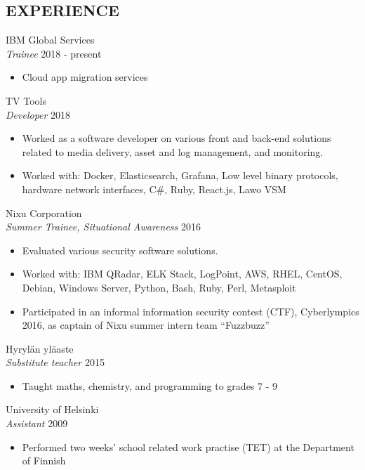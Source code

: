\documentclass[margin, 10pt]{res} %
\begin{document}
\begin{resume}

%
%

 
\section{EXPERIENCE}
  
IBM Global Services\\
{\sl Trainee} \hfill 2018 - present
\begin{itemize} \itemsep -2pt %
\item Cloud app migration services
\end{itemize}

\addvspace{-7pt}
TV Tools\\
{\sl Developer} \hfill 2018
\begin{itemize} \itemsep -2pt %
\item Worked as a software developer on various front and back-end solutions related to media delivery, asset and log management, and monitoring.
\item Worked with: Docker, Elasticsearch, Grafana, Low level binary protocols, hardware network interfaces, C\#, Ruby, React.js, Lawo VSM
\end{itemize}

\addvspace{-7pt}
Nixu Corporation\\
{\sl Summer Trainee, Situational Awareness} \hfill 2016
\begin{itemize} \itemsep -2pt %
\item Evaluated various security software solutions.
\item Worked with:  IBM QRadar, ELK Stack, LogPoint, AWS, RHEL, CentOS, Debian, Windows Server, Python, Bash, Ruby, Perl, Metasploit
\item Participated in an informal information security contest (CTF), Cyberlympics 2016, as captain of Nixu summer intern team ``Fuzzbuzz''  
\end{itemize}

\addvspace{-7pt}
Hyrylän yläaste\\
{\sl Substitute teacher} \hfill 2015
\begin{itemize} \itemsep -2pt %
\item Taught maths, chemistry, and programming to grades 7 - 9
\end{itemize}
\addvspace{-7pt}
University of Helsinki\\
{\sl Assistant} \hfill 2009
\begin{itemize} \itemsep -2pt %
\item Performed two weeks' school related work practise (TET) at the Department of Finnish
\end{itemize}
  

\end{resume}
\end{document}
